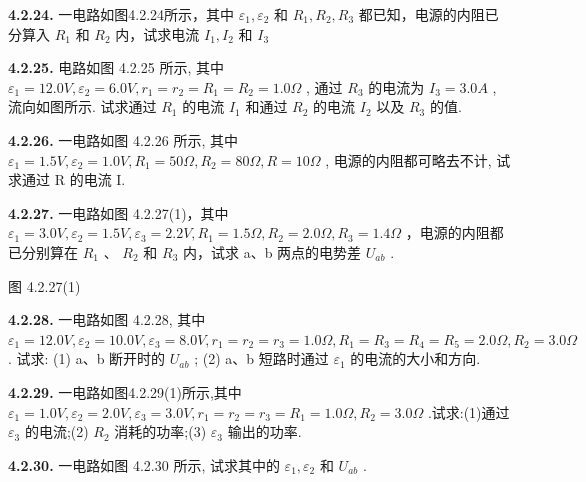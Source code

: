 \vfill
\newpage

\textbf{4.2.24.} 一电路如图4.2.24所示，其中 $\varepsilon_{1},\varepsilon_{2}$ 和 $R_{1},R_{2},R_{3}$ 都已知，电源的内阻已分算入 $R_{1}$ 和 $R_{2}$ 内，试求电流 $I_{1},I_{2}$ 和 $I_{3}$

\vfill
\newpage

\textbf{4.2.25.} 电路如图 4.2.25 所示, 其中 $\varepsilon_{1}=12.0V, \varepsilon_{2}=6.0V, r_{1}=r_{2}=R_{1}=R_{2}=1.0\Omega$ , 通过 $R_{3}$ 的电流为 $I_{3}=3.0A$ , 流向如图所示. 试求通过 $R_{1}$ 的电流 $I_{1}$ 和通过 $R_{2}$ 的电流 $I_{2}$ 以及 $R_{3}$ 的值.

\vfill
\newpage

\textbf{4.2.26.} 一电路如图 4.2.26 所示, 其中 $\varepsilon_{1}=1.5V, \varepsilon_{2}=1.0V, R_{1}=50\Omega, R_{2}=80\Omega, R=10\Omega$ , 电源的内阻都可略去不计, 试求通过 R 的电流 I.

\begin{center}
\end{center}

\vfill
\newpage

\textbf{4.2.27.} 一电路如图 4.2.27(1)，其中 $\varepsilon_{1}=3.0V,\varepsilon_{2}=1.5V,\varepsilon_{3}=2.2V,R_{1}=1.5\Omega,R_{2}=2.0\Omega,R_{3}=1.4\Omega$ ，电源的内阻都已分别算在 $R_{1}$ 、 $R_{2}$ 和 $R_{3}$ 内，试求 a、b 两点的电势差 $U_{ab}$ .

图 4.2.27(1)

\begin{center}
\end{center}

\vfill
\newpage

\textbf{4.2.28.} 一电路如图 4.2.28, 其中 $\varepsilon_{1}=12.0V, \varepsilon_{2}=10.0V, \varepsilon_{3}=8.0V, r_{1}=r_{2}=r_{3}=1.0\Omega, R_{1}=R_{3}=R_{4}=R_{5}=2.0\Omega, R_{2}=3.0\Omega$ . 试求: (1) a、b 断开时的 $U_{ab}$ ; (2) a、b 短路时通过 $\varepsilon_{1}$ 的电流的大小和方向.

\vfill
\newpage

\textbf{4.2.29.} 一电路如图4.2.29(1)所示,其中 $\varepsilon_{1}=1.0V,\varepsilon_{2}=2.0V,\varepsilon_{3}=3.0V,r_{1}=r_{2}=r_{3}=R_{1}=1.0\Omega,R_{2}=3.0\Omega$ .试求:(1)通过 $\varepsilon_{3}$ 的电流;(2) $R_{2}$ 消耗的功率;(3) $\varepsilon_{3}$ 输出的功率.

\vfill
\newpage

\textbf{4.2.30.} 一电路如图 4.2.30 所示, 试求其中的 $\varepsilon_{1}, \varepsilon_{2}$ 和 $U_{ab}$ .

